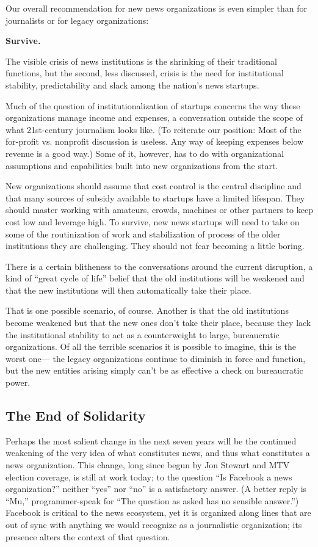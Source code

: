 Our overall recommendation for new news organizations is even simpler than
for journalists or for legacy organizations:

\textbf{Survive.}

The visible crisis of news institutions is the shrinking of their traditional functions,
but the second, less discussed, crisis is the need for institutional stability,
predictability and slack among the nation’s news startups.

Much of the question of institutionalization of startups concerns the way these
organizations manage income and expenses, a conversation outside the scope
of what 21st-century journalism looks like. (To reiterate our position: Most of
the for-profit vs. nonprofit discussion is useless. Any way of keeping expenses
below revenue is a good way.) Some of it, however, has to do with organizational
assumptions and capabilities built into new organizations from the start.

New organizations should assume that cost control is the central discipline and
that many sources of subsidy available to startups have a limited lifespan. They
should master working with amateurs, crowds, machines or other partners to
keep cost low and leverage high. To survive, new news startups will need to take
on some of the routinization of work and stabilization of process of the older
institutions they are challenging. They should not fear becoming a little boring.

There is a certain blitheness to the conversations around the current disruption, a
kind of ``great cycle of life'' belief that the old institutions will be weakened and
that the new institutions will then automatically take their place.

That is one possible scenario, of course. Another is that the old institutions
become weakened but that the new ones don’t take their place, because they lack
the institutional stability to act as a counterweight to large, bureaucratic organizations.
Of all the terrible scenarios it is possible to imagine, this is the worst one—
the legacy organizations continue to diminish in force and function, but the new
entities arising simply can’t be as effective a check on bureaucratic power.

\subsection{The End of Solidarity}

Perhaps the most salient change in the next seven years will be the continued
weakening of the very idea of what constitutes news, and thus what constitutes
a news organization. This change, long since begun by Jon Stewart and MTV
election coverage, is still at work today; to the question ``Is Facebook a news
organization?'' neither ``yes'' nor ``no'' is a satisfactory answer. (A better reply is
``Mu,'' programmer-speak for ``The question as asked has no sensible answer.'')
Facebook is critical to the news ecosystem, yet it is organized along lines that are
out of sync with anything we would recognize as a journalistic organization; its
presence alters the context of that question.

